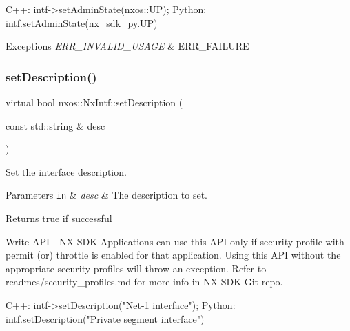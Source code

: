 \begin{DoxyCode}
C++:
   intf->setAdminState(nxos::UP);
Python:
   intf.setAdminState(nx\_sdk\_py.UP)
\end{DoxyCode}



\begin{DoxyExceptions}{Exceptions}
{\em E\+R\+R\+\_\+\+I\+N\+V\+A\+L\+I\+D\+\_\+\+U\+S\+A\+GE} & E\+R\+R\+\_\+\+F\+A\+I\+L\+U\+RE \\
\hline
\end{DoxyExceptions}
\mbox{\label{classnxos_1_1_nx_intf_aaaa5e4a9b9161b2908eb9c7979e96f8e}} 
\subsubsection{\texorpdfstring{set\+Description()}{setDescription()}}
{\footnotesize\ttfamily virtual bool nxos\+::\+Nx\+Intf\+::set\+Description (\begin{DoxyParamCaption}\item[{const std\+::string \&}]{desc }\end{DoxyParamCaption})\hspace{0.3cm}{\ttfamily [pure virtual]}}

Set the interface description. 
\begin{DoxyParams}[1]{Parameters}
\mbox{\tt in}  & {\em desc} & The description to set. \\
\hline
\end{DoxyParams}
\begin{DoxyReturn}{Returns}
true if successful
\end{DoxyReturn}
\begin{DoxyVerb}Write API - NX-SDK Applications can use this API only if security profile with permit (or) throttle is 
            enabled for that application. Using this API without the appropriate security profiles will
            throw an exception. Refer to readmes/security_profiles.md for more info in NX-SDK Git repo.
\end{DoxyVerb}



\begin{DoxyCode}
C++:
   intf->setDescription(\textcolor{stringliteral}{"Net-1 interface"});
Python:
   intf.setDescription(\textcolor{stringliteral}{"Private segment interface"})
\end{DoxyCode}



